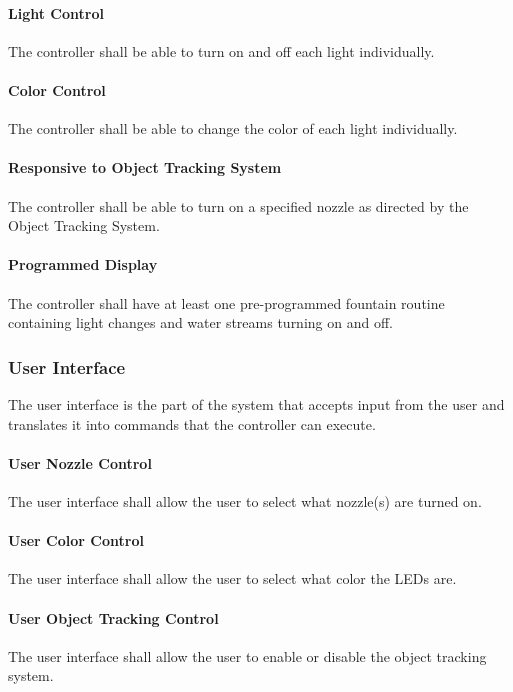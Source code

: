 \paragraph{Light Control}
The controller shall be able to turn on and off each light individually.

\paragraph{Color Control}
The controller shall be able to change the color of each light individually.

\paragraph{Responsive to Object Tracking System} 
The controller shall be able to turn on a specified nozzle as directed by the Object Tracking System.

\paragraph{Programmed Display}
The controller shall have at least one pre-programmed fountain routine containing light changes and water streams turning on and off.

\subsubsection{User Interface}
The user interface is the part of the system that accepts input from the user and translates it into commands that the controller can execute. 

\paragraph{User Nozzle Control}
The user interface shall allow the user to select what nozzle(s) are turned on.

\paragraph{User Color Control}
The user interface shall allow the user to select what color the LEDs are.

\paragraph{User Object Tracking Control}
The user interface shall allow the user to enable or disable the object tracking system.

